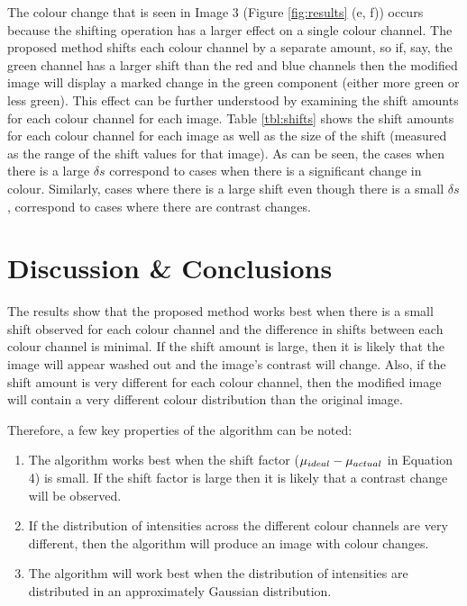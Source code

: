 \documentclass[journal,transmag]{IEEEtran}
\begin{document}
The colour change that is seen in Image 3 (Figure \ref{fig:results} (e, f)) occurs because the shifting operation has a larger effect on a single colour channel.  The proposed method shifts each colour channel by a separate amount, so if, say, the green channel has a larger shift than the red and blue channels then the modified image will display a marked change in the green component (either more green or less green).  This effect can be further understood by examining the shift amounts for each colour channel for each image.   Table \ref{tbl:shifts} shows the shift amounts for each colour channel for each image as well as the size of the shift (measured as the range of the shift values for that image).  As can be seen, the cases when there is a large $\delta s$ correspond to cases when there is a significant change in colour.   Similarly, cases where there is a large shift even though there is a small $\delta s$, correspond to cases where there are contrast changes.




\section{Discussion \& Conclusions}
\label{sec:discussion}

The results show that the proposed method works best when there is a small shift observed for each colour channel and the difference in shifts between each colour channel is minimal.  If the shift amount is large, then it is likely that the image will appear washed out and the image's contrast will change.  Also, if the shift amount is very different for each colour channel, then the modified image will contain a very different colour distribution than the original image.   

Therefore, a few key properties of the algorithm can be noted:

\begin{enumerate}
\item The algorithm works best when the shift factor ($\mu_{\mbox{\tiny{ideal}}} - \mu_{\mbox{\tiny{actual}}}$ in Equation 4) is small.  If the shift factor is large then it is likely that a contrast change will be observed.
\item If the distribution of intensities across the different colour channels are very different, then the algorithm will produce an image with colour changes.
\item The algorithm will work best when the distribution of intensities are distributed in an approximately Gaussian distribution. 
\end{enumerate}
\end{document}
